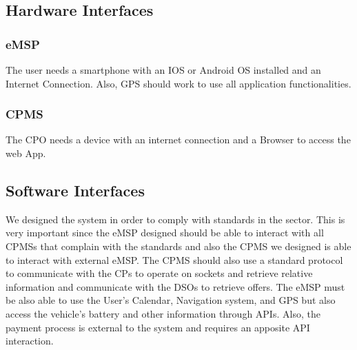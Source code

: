 \documentclass{Configuration_Files/PoliMi3i_thesis}
\begin{document}
\subsection{Hardware Interfaces}

\subsubsection{eMSP}

The user needs a smartphone with an IOS or Android OS installed and an Internet Connection. Also, GPS should work to use all application functionalities. 

\subsubsection{CPMS}
The CPO needs a device with an internet connection and a Browser to access the web App. 


\subsection{Software Interfaces}

We designed the system in order to comply with standards in the sector. This is very important since the eMSP designed should be able to interact with all CPMSs that complain with the standards and also the CPMS we designed is able to interact with external eMSP.
The CPMS should also use a standard protocol to communicate with the CPs to operate on sockets and retrieve relative information and communicate with the DSOs to retrieve offers. The eMSP must be also able to use the User's Calendar, Navigation system, and GPS but also access the vehicle's battery and other information through APIs.
Also, the payment process is external to the system and requires an apposite API interaction.
\end{document}
